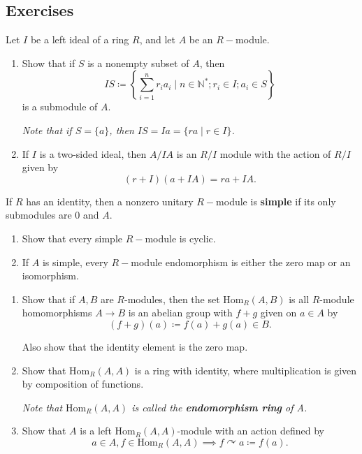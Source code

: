 \subsection{Exercises}

\begin{problem}[Hungerford 4.1.3]
Let $I$ be a left ideal of a ring $R$, and let $A$ be an $R-$module.

\begin{enumerate}
    \item Show that if $S$ is a nonempty subset of $A$, then
    \[
    IS \coloneqq \left\{ \sum_{i=1}^n r_i a_i \mid n\in \mathbb{N}^*; r_i \in I; a_i \in S \right\}
    \]
    is a submodule of $A$. 
    
    \textit{Note that if $S = \{a\}$, then $IS = Ia = \{ra \mid r\in I\}$.}
    
    \item If $I$ is a two-sided ideal, then $A/IA$ is an $R/I$ module with the action of $R/I$ given by
    \[
    (r+I)(a+IA) = ra + IA.
    \]
\end{enumerate}
\end{problem}

\begin{problem}[Hungerford 4.1.5]
If $R$ has an identity, then a nonzero unitary $R-$module is \textbf{simple} if its only submodules are $0$ and $A$.
\begin{enumerate}
    \item Show that every simple $R-$module is cyclic.
    \item If $A$ is simple, every $R-$module endomorphism is either the zero map or an isomorphism.
\end{enumerate}
\end{problem}

\begin{problem}[Hungerford 4.1.7]
\begin{enumerate}
    \item Show that if $A,B$ are $R$-modules, then the set $\mathrm{Hom}_R(A, B)$ is all $R$-module homomorphisms $A \to B$ is an abelian group with $f+g$ given on $a\in A$ by
    \[
    (f+g)(a) \coloneqq f(a) + g(a) \in B.
    \]
    
    Also show that the identity element is the zero map.
    
    \item Show that $\mathrm{Hom}_R(A, A)$ is a ring with identity, where multiplication is given by composition of functions.
    
    \textit{Note that $\mathrm{Hom}_R(A, A)$ is called the \textbf{endomorphism ring} of A.}
    
    \item Show that $A$ is a left $\mathrm{Hom}_R(A, A)$-module with an action defined by 
    \[
    a\in A, f\in \mathrm{Hom}_R(A, A) \implies f \curvearrowright a \coloneqq f(a).
    \]
\end{enumerate}
\end{problem}

